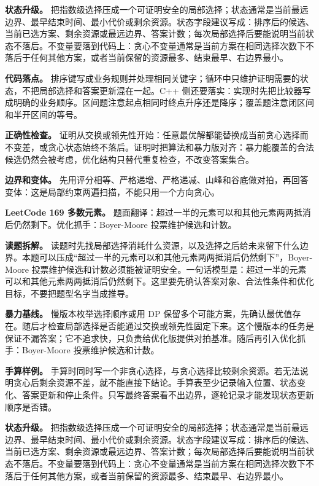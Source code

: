 \textbf{状态升级。} 把指数级选择压成一个可证明安全的局部选择；状态通常是当前最远边界、最早结束时间、最小代价或剩余资源。状态字段建议写成：排序后的候选、当前已选方案、剩余资源或最远边界、答案计数；每次局部选择后要能说明当前状态不落后。不变量要落到代码上：贪心不变量通常是当前方案在相同选择次数下不落后于任何其他方案，或者当前保留的资源最多、结束最早、右边界最小。

\textbf{代码落点。} 排序键写成业务规则并处理相同关键字；循环中只维护证明需要的状态，不把局部选择和答案更新混在一起。C++ 侧还要落实：实现时先把比较器写成明确的业务顺序。区间题注意起点相同时终点升序还是降序；覆盖题注意闭区间和半开区间的等号。

\textbf{正确性检查。} 证明从交换或领先性开始：任意最优解都能替换成当前贪心选择而不变差，或贪心状态始终不落后。证明时把算法和暴力版对齐：暴力能覆盖的合法候选仍然会被考虑，优化结构只替代重复检查，不改变答案集合。

\textbf{边界和变体。} 先用评分相等、严格递增、严格递减、山峰和谷底做对拍，再回答变体：这是局部约束两遍扫描，不能只用一个方向贪心。

\noindent\textbf{LeetCode 169 多数元素。} 题面翻译：超过一半的元素可以和其他元素两两抵消后仍然剩下。优化抓手：Boyer-Moore 投票维护候选和计数。

\textbf{读题拆解。} 读题时先找局部选择消耗什么资源，以及选择之后给未来留下什么边界。本题可以压成“超过一半的元素可以和其他元素两两抵消后仍然剩下”，Boyer-Moore 投票维护候选和计数必须能被证明安全。一句话模型是：超过一半的元素可以和其他元素两两抵消后仍然剩下。这里要先确认答案对象、合法性条件和优化目标，不要把题型名字当成推导。

\textbf{暴力基线。} 慢版本枚举选择顺序或用 DP 保留多个可能方案，先确认最优值存在。随后才检查局部选择是否能通过交换或领先性固定下来。这个慢版本的任务是保证不漏答案；它不追求快，只负责给优化版提供对拍基准。随后再引入优化抓手：Boyer-Moore 投票维护候选和计数。

\textbf{手算样例。} 手算时同时写一个非贪心选择，与贪心选择比较剩余资源。若无法说明贪心后剩余资源不差，就不能直接下结论。手算表至少记录输入位置、状态变化、答案更新和停止条件。只写最终答案看不出边界，逐轮记录才能发现状态更新顺序是否错。

\textbf{状态升级。} 把指数级选择压成一个可证明安全的局部选择；状态通常是当前最远边界、最早结束时间、最小代价或剩余资源。状态字段建议写成：排序后的候选、当前已选方案、剩余资源或最远边界、答案计数；每次局部选择后要能说明当前状态不落后。不变量要落到代码上：贪心不变量通常是当前方案在相同选择次数下不落后于任何其他方案，或者当前保留的资源最多、结束最早、右边界最小。

